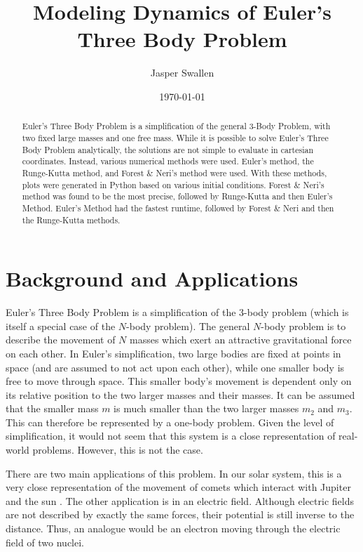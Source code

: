 \documentclass[preprint,titlepage,preprintnumbers,amsmath,amssymb,aps,11pt]{revtex4-2}
\begin{document}
\title{Modeling Dynamics of Euler's Three Body Problem}
\author{Jasper Swallen}
\date{\today}


\begin{abstract}
    Euler's Three Body Problem is a simplification of the general 3-Body Problem, with two fixed large masses and one free mass. While it is possible to solve Euler's Three Body Problem analytically, the solutions are not simple to evaluate in cartesian coordinates. Instead, various numerical methods were used. Euler's method, the Runge-Kutta method, and Forest \& Neri's method were used. With these methods, plots were generated in Python based on various initial conditions. Forest \& Neri's method was found to be the most precise, followed by Runge-Kutta and then Euler's Method. Euler's Method had the fastest runtime, followed by Forest \& Neri and then the Runge-Kutta methods.
        {\singlespacing \tableofcontents}
\end{abstract}

\maketitle


\section{Background and Applications}
Euler's Three Body Problem is a simplification of the 3-body problem (which is itself a special case of the $N$-body problem). The general $N$-body problem is to describe the movement of $N$ masses which exert an attractive gravitational force on each other. In Euler's simplification, two large bodies are fixed at points in space (and are assumed to not act upon each other), while one smaller body is free to move through space. This smaller body's movement is dependent only on its relative position to the two larger masses and their masses. It can be assumed that the smaller mass $m$ is much smaller than the two larger masses $m_2$ and $m_3$. This can therefore be represented by a one-body problem. Given the level of simplification, it would not seem that this system is a close representation of real-world problems. However, this is not the case.

There are two main applications of this problem. In our solar system, this is a very close representation of the movement of comets which interact with Jupiter and the sun \cite{Worthington2012,Koon2000}. The other application is in an electric field. Although electric fields are not described by exactly the same forces, their potential is still inverse to the distance. Thus, an analogue would be an electron moving through the electric field of two nuclei.
\end{document}
